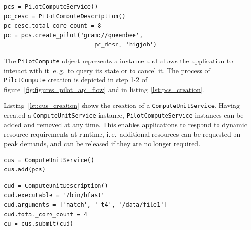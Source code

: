 \documentclass[conference]{IEEEtran}
\begin{document}
\lstset{
language=Python,
frame=single,
captionpos=b,
stringstyle=\ttfamily,
basicstyle=\scriptsize\ttfamily
}

\begin{minipage}{0.45 \textwidth}
\begin{lstlisting}[caption={Instantiation of a Pilot Service using a Pilot Compute Description.}, label={lst:pcs_creation}]
pcs = PilotComputeService()
pc_desc = PilotComputeDescription()
pc_desc.total_core_count = 8
pc = pcs.create_pilot('gram://queenbee', 
                          pc_desc, 'bigjob')
\end{lstlisting}
\end{minipage}

The \texttt{Pilot\-Compute} object represents a \pilot instance and allows the 
application to interact with it, e.\,g.\ to query its state or to cancel 
it. The process of \texttt{Pilot\-Compute} creation is depicted in step 1-2 of 
figure~\ref{fig:figures_pilot_api_flow} and in listing~\ref{lst:pcs_creation}.

Listing~\ref{lst:cus_creation} shows the creation of
a \texttt{Compute\-Unit\-Service}.  Having created
a \texttt{Compute\-Unit\-Service} instance, \texttt{Pilot\-Compute\-Service}
instances can be added and removed at any time.  This enables applications to
respond to dynamic resource requirements at runtime, i.\,e.\ additional
resources can be requested on peak demands, and can be released if they are no
longer required.\\

\begin{minipage}{0.45 \textwidth}
\begin{lstlisting}[caption={Instantiation
of a \texttt{ComputeUnitService} using a reference to the
\texttt{PilotComputeService}.}, label={lst:cus_creation}]
cus = ComputeUnitService()
cus.add(pcs)
\end{lstlisting}

\end{minipage}

\begin{minipage}{0.45 \textwidth}
\begin{lstlisting}[caption={Instantiation and 
	submission of a \texttt{ComputeUnitDescription}.}, label={lst:submission}] 
cud = ComputeUnitDescription()
cud.executable = '/bin/bfast'
cud.arguments = ['match', '-t4', '/data/file1']
cud.total_core_count = 4
cu = cus.submit(cud)
\end{lstlisting}

\end{minipage}
\end{document}
